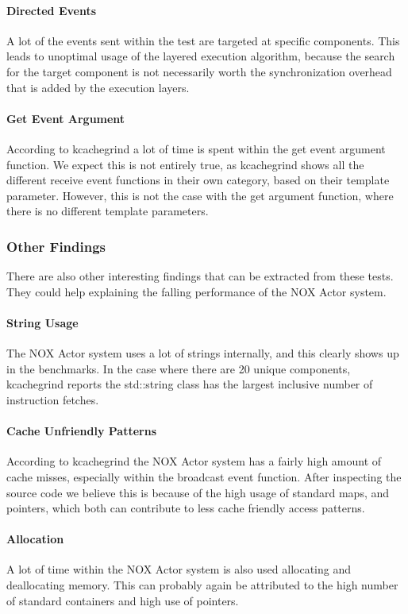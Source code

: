\paragraph{Directed Events}
A lot of the events sent within the test are targeted at specific components.
This leads to unoptimal usage of the layered execution algorithm, because the search for the target component
is not necessarily worth the synchronization overhead that is added by the execution layers.

\paragraph{Get Event Argument}
According to kcachegrind a lot of time is spent within the get event argument function.
We expect this is not entirely true, as kcachegrind shows all the different receive event functions in their own category,
based on their template parameter.
However, this is not the case with the get argument function, where there is no different template parameters.

\subsubsection{Other Findings}
There are also other interesting findings that can be extracted from these tests.
They could help explaining the falling performance of the NOX Actor system.

\paragraph{String Usage}
The NOX Actor system uses a lot of strings internally, and this clearly shows up in the benchmarks.
In the case where there are 20 unique components, kcachegrind reports the std::string class has the largest
inclusive number of instruction fetches.

\paragraph{Cache Unfriendly Patterns}
According to kcachegrind the NOX Actor system has a fairly high amount of cache misses,
especially within the broadcast event function.
After inspecting the source code we believe this is because of the high usage of standard maps, and pointers, which
both can contribute to less cache friendly access patterns.

\paragraph{Allocation}
A lot of time within the NOX Actor system is also used allocating and deallocating memory.
This can probably again be attributed to the high number of standard containers and high use of pointers.

